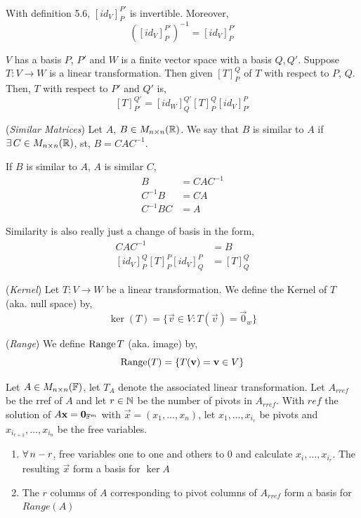 \documentclass{article}
\begin{document}
\begin{ncor}
  With definition 5.6, $[id_V]_P^{P'}$ is invertible. Moreover,
  $$ \left( [id_V]_{P}^{P'} \right)^{-1} = [id_V]_{P}^{P'} $$
\end{ncor}

\begin{ncor}
  $V$ has a basis $P$, $P'$ and $W$ is a finite vector space with a basis $Q, Q'$. Suppose $T : V \to W$ is a linear transformation. Then given $[T]_P^Q$ of $T$ with respect to $P$, $Q$. Then, $T$ with respect to $P'$ and $Q'$ is,
  $$ [T]_{P'}^{Q'} = [id_W]_Q^{Q'} [T]_P^Q [id_V]_{P'}^P $$
\end{ncor}

\begin{ndefi}{(\textit{Similar Matrices})}
  Let $A$, $B \in M_{n\times n}(\mathbb{R})$. We say that $B$ is similar to $A$ if $\exists\, C\in M_{n\times n}(\mathbb{R})$, st, $B = CAC^{-1}$.
\end{ndefi}

\begin{ncor}
  If $B$ is similar to $A$, $A$ is similar $C$,
  \begin{align*}
    B &= CAC^{-1}\\
    C^{-1}B &= CA\\
    C^{-1}BC &= A
  \end{align*}
\end{ncor}
Similarity is also really just a change of basis in the form,
\begin{align*}
  CAC^{-1} &= B\\
  [id_V]_P^Q[T]_P^P [id_V]_Q^P &= [T]_Q^Q
\end{align*}


\begin{ndefi}{(\textit{Kernel})}
  Let $T : V\to W$ be a linear transformation. We define the Kernel of $T$ (aka. null space) by,
  $$ \ker(T) = \{ \vec v \in V : T(\vec v) = \vec 0_w \} $$
\end{ndefi}

\begin{ndefi}{(\textit{Range})}
  We define $\operatorname{Range} T$ (aka. image) by,
  $$ \operatorname{Range} (T) = \{ T(\boldsymbol{\mathbf{v}}) = \boldsymbol{\mathbf{v}} \in V\} $$
\end{ndefi}

\begin{nlemma}
  Let $A\in M_{n\times n}(\mathbb{F})$, let $T_A$ denote the associated linear transformation. Let $A_{rref}$ be the rref of $A$ and let $r \in \mathbb{N}$ be the number of pivots in $A_{rref}$. With $ref$ the solution of $A\boldsymbol{\mathbf{x}} = \boldsymbol{\mathbf{0}}_{\mathbb{F}^m}$ with $\vec x = (x_1, \dots, x_n)$, let $x_1, \dots, x_{i_r}$ be pivots and $x_{i_{r+1}}, \dots, x_{i_n}$ be the free variables.
  \begin{enumerate}
    \item $\forall\, n - r$, free variables one to one and others to 0 and calculate $x_i,\dots, x_{i_r}$. The resulting $\vec x$ form a basis for $\ker A$\\
    \item The $r$ columns of $A$ corresponding to pivot columns of $A_{rref}$ form a basis for $Range (A)$
  \end{enumerate}
\end{nlemma}
\end{document}
